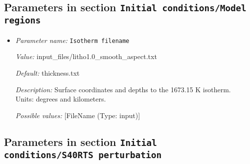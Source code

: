 \subsection{Parameters in section \tt Initial conditions/Model regions}
\label{parameters:Initial_20conditions/Model_20regions}

\begin{itemize}
\item {\it Parameter name:} {\tt Isotherm filename}
\label{parameters:Initial conditions/Model regions/Isotherm filename}


{\it Value:} input_files/litho1.0_smooth_aspect.txt


{\it Default:} thickness.txt


{\it Description:} Surface coordinates and depths to the 1673.15 K isotherm. Units: degrees and kilometers.


{\it Possible values:} [FileName (Type: input)]
\end{itemize}

\subsection{Parameters in section \tt Initial conditions/S40RTS perturbation}
\label{parameters:Initial_20conditions/S40RTS_20perturbation}

